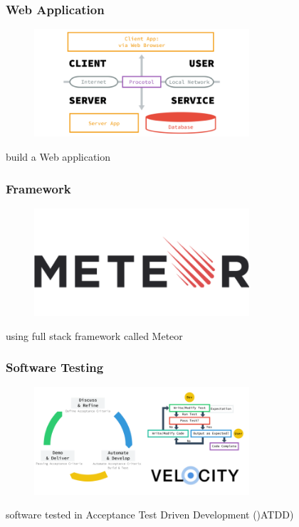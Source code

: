 \documentclass[10pt, compress]{beamer}
\begin{document}

\begin{frame}[fragile]
  \frametitle{Web Application}
  \centering

  \begin{figure}[ht]
    \includegraphics[width=8cm]{include/literature-webapp.png}
  \end{figure}

  build a \alert{Web application}\\

\end{frame}


\begin{frame}[fragile]
  \frametitle{Framework}
  \centering

  \begin{figure}[ht]
    \includegraphics[width=8cm]{include/literature-framework.png}
  \end{figure}

  using \alert{full stack framework} called \alert{Meteor}

\end{frame}


\begin{frame}[fragile]
  \frametitle{Software Testing}
  \centering

  \begin{figure}[ht]
    \includegraphics[width=8cm]{include/literature-testing.png}
  \end{figure}

  \alert{software tested} in Acceptance Test Driven Development ()\alert{ATDD})

\end{frame}
\end{document}
